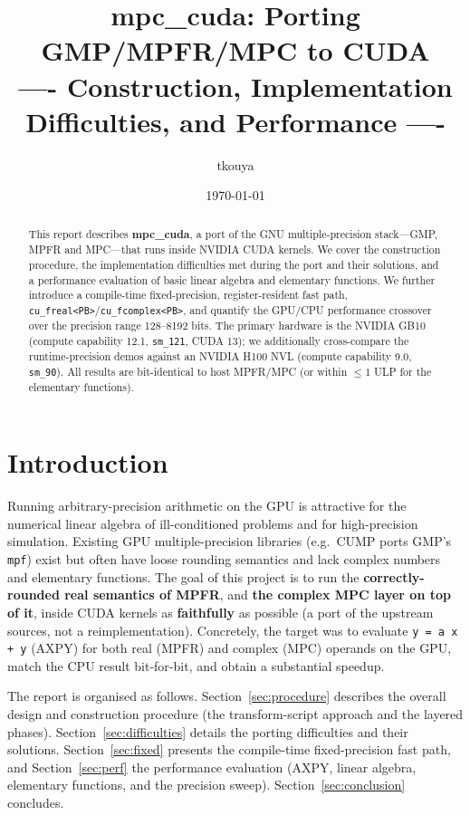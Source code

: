 \documentclass[uplatex,dvipdfmx,a4paper,11pt]{jsarticle}
\title{mpc\_cuda: Porting GMP/MPFR/MPC to CUDA\\
{\large ---- Construction, Implementation Difficulties, and Performance ----}}
\author{tkouya}
\date{\today}
\newcommand{\code}[1]{\texttt{#1}}
\begin{document}
\maketitle

\begin{abstract}
This report describes \textbf{mpc\_cuda}, a port of the GNU multiple-precision
stack---GMP, MPFR and MPC---that runs inside NVIDIA CUDA kernels. We cover the
construction procedure, the implementation difficulties met during the port and
their solutions, and a performance evaluation of basic linear algebra and
elementary functions. We further introduce a compile-time fixed-precision,
register-resident fast path, \code{cu\_freal<PB>}/\code{cu\_fcomplex<PB>}, and
quantify the GPU/CPU performance crossover over the precision range
128--8192 bits. The primary hardware is the NVIDIA GB10 (compute capability 12.1,
\code{sm\_121}, CUDA 13); we additionally cross-compare the runtime-precision
demos against an NVIDIA H100 NVL (compute capability 9.0, \code{sm\_90}). All
results are bit-identical to host MPFR/MPC (or within $\le 1$ ULP for the
elementary functions).
\end{abstract}

\tableofcontents
\bigskip

\section{Introduction}
\label{sec:intro}

Running arbitrary-precision arithmetic on the GPU is attractive for the
numerical linear algebra of ill-conditioned problems and for high-precision
simulation. Existing GPU multiple-precision libraries (e.g.\ CUMP ports GMP's
\code{mpf}) exist but often have loose rounding semantics and lack complex
numbers and elementary functions. The goal of this project is to run the
\textbf{correctly-rounded real semantics of MPFR}, and \textbf{the complex MPC
layer on top of it}, inside CUDA kernels as \textbf{faithfully} as possible
(a port of the upstream sources, not a reimplementation). Concretely, the target
was to evaluate \code{y = a\,x + y} (AXPY) for both real (MPFR) and complex (MPC)
operands on the GPU, match the CPU result bit-for-bit, and obtain a substantial
speedup.

The report is organised as follows. Section~\ref{sec:procedure} describes the
overall design and construction procedure (the transform-script approach and the
layered phases). Section~\ref{sec:difficulties} details the porting difficulties
and their solutions. Section~\ref{sec:fixed} presents the compile-time
fixed-precision fast path, and Section~\ref{sec:perf} the performance evaluation
(AXPY, linear algebra, elementary functions, and the precision sweep).
Section~\ref{sec:conclusion} concludes.
\end{document}
